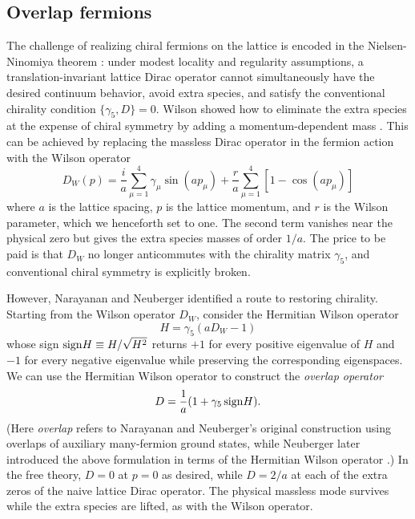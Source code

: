 \documentclass[11pt,a4paper]{article}
\theoremstyle{remark}
\begin{document}
\subsection{Overlap fermions}

The challenge of realizing chiral fermions on the lattice is encoded in the Nielsen-Ninomiya theorem \cite{NielsenNinomiya}: under modest locality and regularity assumptions, a translation-invariant lattice Dirac operator cannot simultaneously have the desired continuum behavior, avoid extra species, and satisfy the conventional chirality condition $\{\gamma_5,D\}=0$. Wilson showed how to eliminate the extra species at the expense of chiral symmetry by adding a momentum-dependent mass \cite{WilsonFermions}. This can be achieved by replacing the massless Dirac operator in the fermion action with the Wilson operator
\begin{equation}
D_W(p)
= \frac{i}{a}\sum_{\mu=1}^{4}\gamma_\mu \sin(ap_\mu)
+ \frac{r}{a}\sum_{\mu=1}^{4}\left[1-\cos(ap_\mu)\right]
\end{equation}
where $a$ is the lattice spacing, $p$ is the lattice momentum, and $r$ is the Wilson parameter, which we henceforth set to one. The second term vanishes near the physical zero but gives the extra species masses of order $1/a$. The price to be paid is that $D_W$ no longer anticommutes with the chirality matrix $\gamma_5$, and conventional chiral symmetry is explicitly broken.

However, Narayanan and Neuberger \cite{NarayananNeuberger,NarayananNeubergerConstruction} identified a route to restoring chirality. Starting from the Wilson operator $D_W$, consider the Hermitian Wilson operator
\begin{equation}
H = \gamma_5(a D_W - 1)
\end{equation}
whose sign ${\rm sign} H \equiv  H/ \sqrt{H^2}$ returns $+1$ for every positive eigenvalue of $H$ and $-1$ for every negative eigenvalue while preserving the corresponding eigenspaces. We can use the Hermitian Wilson operator to construct the {\it overlap operator}
\begin{equation}
D = \frac{1}{a} (1 + \gamma_5 \, {\rm sign} H) .
\end{equation}
(Here {\it overlap} refers to Narayanan and Neuberger's original construction using overlaps of auxiliary many-fermion ground states, while Neuberger later introduced the above formulation in terms of the Hermitian Wilson operator \cite{Neuberger}.) In the free theory, $D = 0$ at $p = 0$ as desired, while $D = 2/a$ at each of the extra zeros of the naive lattice Dirac operator. The physical massless mode survives while the extra species are lifted, as with the Wilson operator.
\end{document}
